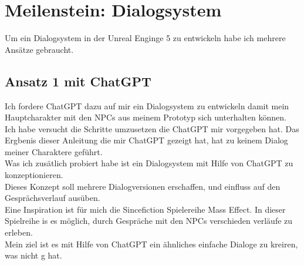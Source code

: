 \section {Meilenstein: Dialogsystem}
Um ein Dialogsystem in der Unreal Enginge 5 zu entwickeln habe ich mehrere Ansätze gebraucht.

\subsection{Ansatz 1 mit ChatGPT}
Ich fordere ChatGPT dazu auf mir ein Dialogsystem zu entwickeln damit mein Hauptcharakter mit den NPCs aus meinem Prototyp sich unterhalten können.
\\
Ich habe versucht die Schritte umzusetzen die ChatGPT mir vorgegeben hat. Das Ergbenis dieser Anleitung die mir ChatGPT gezeigt hat, hat zu keinem Dialog meiner Charaktere geführt.
\\
Was ich zusätlich probiert habe ist ein Dialogsystem mit Hilfe von ChatGPT zu konzeptionieren.
\\
Dieses Konzept soll mehrere Dialogversionen erschaffen, und einfluss auf den Gesprächsverlauf ausüben.
\\
Eine Inspiration ist für mich die Sincefiction Spielereihe Mass Effect. In dieser Spielreihe is es möglich, durch Gespräche mit den NPCs verschieden verläufe zu erleben.
\\
Mein ziel ist es mit Hilfe von ChatGPT ein ähnliches einfache Dialoge zu kreiren, was nicht g hat.


